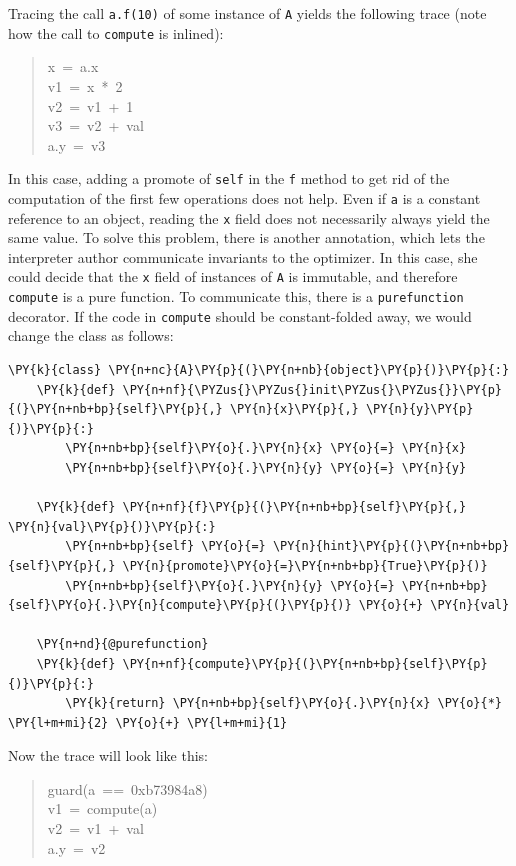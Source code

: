 \documentclass{sig-alternate}
\begin{document}
Tracing the call \texttt{a.f(10)} of some instance of \texttt{A} yields the following
trace (note how the call to \texttt{compute} is inlined):
%
\begin{quote}{\ttfamily \raggedright \noindent
x~=~a.x\\
v1~=~x~*~2\\
v2~=~v1~+~1\\
v3~=~v2~+~val\\
a.y~=~v3
}
\end{quote}

In this case, adding a promote of \texttt{self} in the \texttt{f} method to get rid of the
computation of the first few operations does not help. Even if \texttt{a} is a
constant reference to an object, reading the \texttt{x} field does not necessarily
always yield the same value. To solve this problem, there is another annotation,
which lets the interpreter author communicate invariants to the optimizer. In
this case, she could decide that the \texttt{x} field of instances of \texttt{A} is
immutable, and therefore \texttt{compute}
is a pure function. To communicate this, there is a \texttt{purefunction} decorator.
If the code in \texttt{compute} should be constant-folded away, we would change the
class as follows:
\begin{Verbatim}[commandchars=\\\{\}]
\PY{k}{class} \PY{n+nc}{A}\PY{p}{(}\PY{n+nb}{object}\PY{p}{)}\PY{p}{:}
    \PY{k}{def} \PY{n+nf}{\PYZus{}\PYZus{}init\PYZus{}\PYZus{}}\PY{p}{(}\PY{n+nb+bp}{self}\PY{p}{,} \PY{n}{x}\PY{p}{,} \PY{n}{y}\PY{p}{)}\PY{p}{:}
        \PY{n+nb+bp}{self}\PY{o}{.}\PY{n}{x} \PY{o}{=} \PY{n}{x}
        \PY{n+nb+bp}{self}\PY{o}{.}\PY{n}{y} \PY{o}{=} \PY{n}{y}

    \PY{k}{def} \PY{n+nf}{f}\PY{p}{(}\PY{n+nb+bp}{self}\PY{p}{,} \PY{n}{val}\PY{p}{)}\PY{p}{:}
        \PY{n+nb+bp}{self} \PY{o}{=} \PY{n}{hint}\PY{p}{(}\PY{n+nb+bp}{self}\PY{p}{,} \PY{n}{promote}\PY{o}{=}\PY{n+nb+bp}{True}\PY{p}{)}
        \PY{n+nb+bp}{self}\PY{o}{.}\PY{n}{y} \PY{o}{=} \PY{n+nb+bp}{self}\PY{o}{.}\PY{n}{compute}\PY{p}{(}\PY{p}{)} \PY{o}{+} \PY{n}{val}

    \PY{n+nd}{@purefunction}
    \PY{k}{def} \PY{n+nf}{compute}\PY{p}{(}\PY{n+nb+bp}{self}\PY{p}{)}\PY{p}{:}
        \PY{k}{return} \PY{n+nb+bp}{self}\PY{o}{.}\PY{n}{x} \PY{o}{*} \PY{l+m+mi}{2} \PY{o}{+} \PY{l+m+mi}{1}
\end{Verbatim}

Now the trace will look like this:
%
\begin{quote}{\ttfamily \raggedright \noindent
guard(a~==~0xb73984a8)\\
v1~=~compute(a)\\
v2~=~v1~+~val\\
a.y~=~v2
}
\end{quote}
\end{document}
